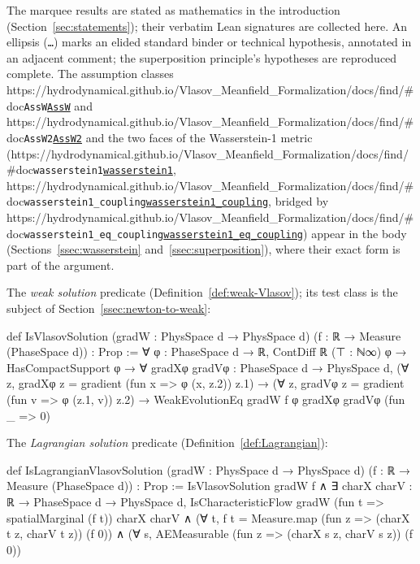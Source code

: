 \documentclass[11pt]{article}
\theoremstyle{plain}
\theoremstyle{definition}
\theoremstyle{remark}
\newcommand{\lean}[1]{\texttt{#1}}
\newcommand{\leanbaseurl}{https://hydrodynamical.github.io/Vlasov\_Meanfield\_Formalization/docs/find/\#doc}
\newcommand{\leanlink}[1]{\ifx\leanbaseurl\empty\lean{#1}\else\href{\leanbaseurl/Vlasov.#1}{\lean{#1}}\fi}
\begin{document}
The marquee results are stated as mathematics in the introduction
(Section~\ref{sec:statements}); their verbatim Lean signatures are collected here. An
ellipsis (\lean{…}) marks an elided standard binder or technical hypothesis, annotated
in an adjacent comment; the superposition principle's hypotheses are reproduced
complete. The
assumption classes \leanlink{AssW} and \leanlink{AssW2} and the two faces of the
Wasserstein-1 metric (\leanlink{wasserstein1}, \leanlink{wasserstein1\_coupling},
bridged by \leanlink{wasserstein1\_eq\_coupling}) appear in the body
(Sections~\ref{ssec:wasserstein} and~\ref{ssec:superposition}), where their exact
form is part of the argument.

\noindent The \emph{weak solution} predicate (Definition~\ref{def:weak-Vlasov}); its
test class is the subject of Section~\ref{ssec:newton-to-weak}:
\begin{leancode}
def IsVlasovSolution (gradW : PhysSpace d → PhysSpace d)
    (f : ℝ → Measure (PhaseSpace d)) : Prop :=
  ∀ φ : PhaseSpace d → ℝ, ContDiff ℝ (⊤ : ℕ∞) φ → HasCompactSupport φ →
    ∀ gradXφ gradVφ : PhaseSpace d → PhysSpace d,
      (∀ z, gradXφ z = gradient (fun x => φ (x, z.2)) z.1) →
      (∀ z, gradVφ z = gradient (fun v => φ (z.1, v)) z.2) →
      WeakEvolutionEq gradW f φ gradXφ gradVφ (fun _ => 0)
\end{leancode}

\noindent The \emph{Lagrangian solution} predicate (Definition~\ref{def:Lagrangian}):
\begin{leancode}
def IsLagrangianVlasovSolution (gradW : PhysSpace d → PhysSpace d)
    (f : ℝ → Measure (PhaseSpace d)) : Prop :=
  IsVlasovSolution gradW f ∧
  ∃ charX charV : ℝ → PhaseSpace d → PhysSpace d,
    IsCharacteristicFlow gradW (fun t => spatialMarginal (f t)) charX charV ∧
    (∀ t, f t = Measure.map (fun z => (charX t z, charV t z)) (f 0)) ∧
    (∀ s, AEMeasurable (fun z => (charX s z, charV s z)) (f 0))
\end{leancode}
\end{document}
